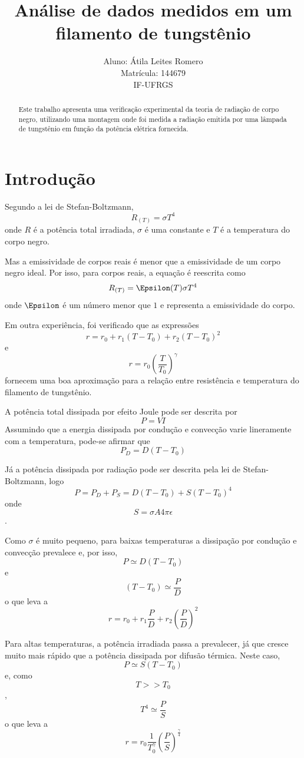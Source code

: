 \documentclass[brazilian,12pt,a4paper,final]{article}
\title{Análise de dados medidos em um filamento de tungstênio}
\author{Aluno: Átila Leites Romero \\ Matrícula: 144679 \\ IF-UFRGS}
\begin{document}
\maketitle

\begin{abstract}
Este trabalho apresenta uma verificação experimental da teoria de radiação de corpo negro, 
utilizando uma montagem onde foi medida a radiação emitida por uma lâmpada de tungstênio 
em função da potência elétrica fornecida.
\end{abstract}

\section{Introdução}
Segundo a lei de Stefan-Boltzmann,
$$ R_{(T)}=\sigma T^4$$
onde $R$ é a potência total irradiada, $\sigma$ é uma constante 
e $T$ é a temperatura do corpo negro. 

Mas a emissividade de corpos reais é menor que a emissividade de um corpo negro ideal.
Por isso, para corpos reais, a equação é reescrita como 
$$ R_{(T)}=\Epsilon(T)\sigma T^4$$
onde $\Epsilon$ é um número menor que $1$ e representa a emissividade do corpo.

Em outra experiência, foi verificado que as expressões
$$r=r_0+r_1(T-T_0)+r_2(T-T_0)^2$$ 
e 
$$r=r_0(\frac{T}{T_0})^\gamma$$
fornecem uma boa aproximação para a
relação entre resistência e temperatura do filamento de tungstênio.

A potência total dissipada por efeito Joule pode ser descrita por 
$$P=VI$$ 
Assumindo que a energia dissipada por condução e convecção varie lineramente 
com a temperatura, pode-se afirmar que 
$$P_D=D(T-T_0)$$

Já a potência dissipada por radiação pode ser descrita pela lei de Stefan-Boltzmann, 
logo 
$$P=P_D+P_S=D(T-T_0)+S(T-T_0)^4$$
onde 
$$S=\sigma A 4\pi\epsilon$$.

Como $\sigma$ é muito pequeno, 
para baixas temperaturas a dissipação por condução e convecção prevalece e,
por isso, 
$$P\simeq D(T-T_0)$$ 
e 
$$(T-T_0)\simeq \frac{P}{D}$$
o que leva a 
$$r=r_0+r_1\frac{P}{D}+r_2(\frac{P}{D})^2$$

Para altas temperaturas, a potência irradiada passa a prevalecer, 
já que cresce muito mais rápido que a potência dissipada por difusão térmica.
Neste caso,  
$$P\simeq S(T-T_0)$$ 
e, como 
$$T>>T_0$$, 
$$T^4\simeq \frac{P}{S}$$
o que leva a 
$$r=r_0\frac{1}{T_0^\gamma}(\frac{P}{S})^\frac{\gamma}{4}$$
\end{document}

